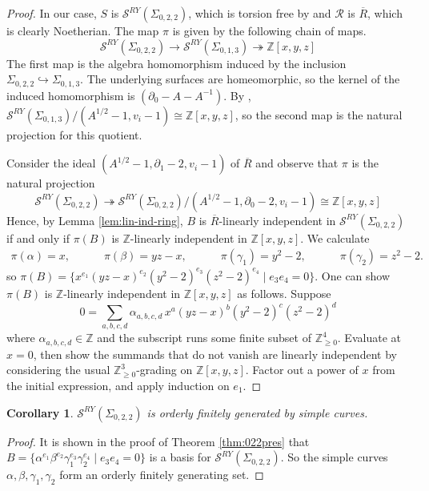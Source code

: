 \documentclass{article}
\newcommand{\del}{\partial}
\newcommand{\Z}{\mathbb{Z}}
\newcommand{\into}{\hookrightarrow}
\newcommand{\onto}{\twoheadrightarrow}
\renewcommand{\a}{\alpha}
\renewcommand{\b}{\beta}
\newcommand{\g}{\gamma}
\renewcommand{\S}{\mathcal{S}}
\newcommand{\SRY}{\mathcal{S}^{RY}}
\newcommand{\san}{\Sigma_{0,2,2}}
\newtheorem{corollary}[theorem]{Corollary}
\theoremstyle{definition}
\renewcommand{\g}{\gamma}
\renewcommand{\a}{\alpha}
\renewcommand{\b}{\beta}
\renewcommand{\san}{\Sigma_{0, 2, 2}}
\renewcommand{\SRY}{\ensuremath{ \mathcal S^{RY}}}
\begin{document}
\begin{proof}
In our case, $S$ is $\SRY(\san)$, which is torsion free by \cite[Theorem~2.4]{RogerYang} 
and $\mathcal{R}$ is $\overline{R}$, which is clearly Noetherian. The map $\pi$ is given by the following chain of maps. 
\[
    \S^{RY}(\Sigma_{0,2,2})\to \S^{RY}(\Sigma_{0,1,3})\onto \Z[x,y,z]
\]
The first map is the algebra homomorphism induced by the inclusion $\Sigma_{0,2,2}\into \Sigma_{0,1,3}$. The underlying surfaces are homeomorphic, so the kernel of the induced homomorphism is $(\del_0-A-A^{-1})$. 
By \cite{MoonPuncSph}, $ \S^{RY}(\Sigma_{0,1,3})/(A^{1/2}-1,v_i-1)\cong \Z[x,y,z]$, so the second map is the natural projection for this quotient. 

Consider the ideal $(A^{1/2}-1,\del_1-2,v_i-1)$ of $\overline{R}$ and observe that $\pi$ is the natural projection 
\[
\SRY(\san)\onto \SRY(\san)/(A^{1/2}-1,\del_0-2,v_i-1)\cong \Z[x,y,z]
\]
Hence, by Lemma \ref{lem:lin-ind-ring}, $B$ is $\overline{R}$-linearly independent in $\SRY(\san)$ if and only if $\pi(B)$ is $\Z$-linearly independent in $\Z[x,y,z]$. 
We calculate
\begin{align*}
        \pi(\a)=x,\qquad\quad
        \pi(\b)=yz-x,\qquad\quad
        \pi(\g_1)=y^2-2,\qquad\quad
        \pi(\g_2)=z^2-2.
\end{align*}
so $\pi(B)=\{ x^{e_1}(yz-x)^{e_2}(y^2-2)^{e_3}(z^2-2)^{e_4}\mid e_3e_4=0 \}.$
One can show $\pi(B)$ is $\Z$-linearly independent in $\Z[x,y,z]$ as follows. Suppose
\begin{equation}
        0=\sum_{a,b,c,d}\a_{a,b,c,d} \, x^a(yz-x)^b(y^2-2)^c(z^2-2)^d
    \label{eq:initlincombo}
    \end{equation}
where $\a_{a,b,c,d}\in \Z$ and the subscript runs some finite subset of $\Z_{\geq0}^4$. Evaluate at $x=0$, then show the summands that do not vanish are linearly independent by considering the usual $\Z_{\geq0}^3$-grading on $\Z[x,y,z]$. Factor out a power of $x$ from the initial expression, and apply induction on $e_1$.
\end{proof} 

 
 
 
\begin{corollary} \label{cor:orderly}
$\mathcal S^{RY}(\san)$ is orderly finitely generated by simple curves.  
\end{corollary}

\begin{proof} 
It is shown in the proof of Theorem \ref{thm:022pres} that  $B=\{\a^{e_1}\b^{e_2}\g_1^{e_3}\g_2^{e_4}\mid e_3e_4=0\}$ is a basis for $\mathcal S^{RY}(\san)$.  So the simple curves $\a, \b, \g_1, \g_2$ form an orderly finitely generating set.  
\end{proof} 
\end{document}
